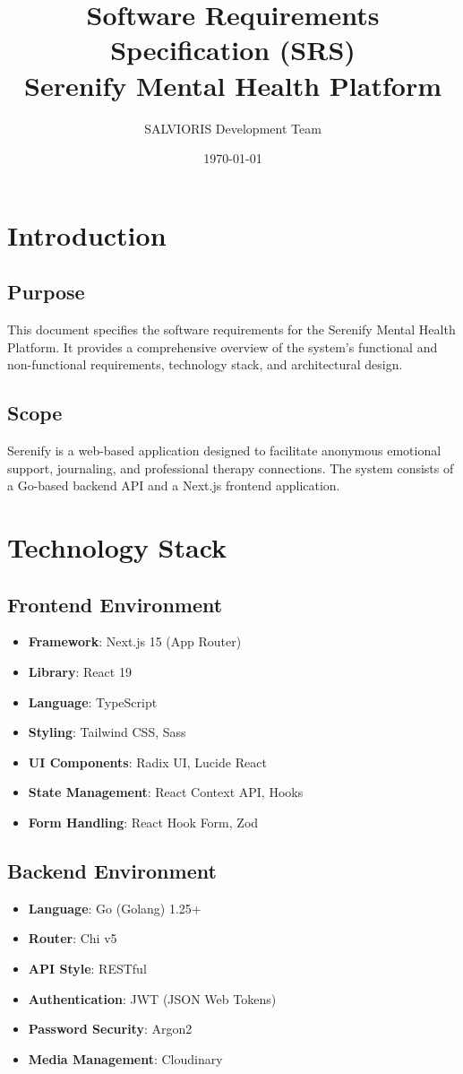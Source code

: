 \documentclass[11pt,a4paper]{article}
\title{\textbf{Software Requirements Specification (SRS) \\ Serenify Mental Health Platform}}
\author{SALVIORIS Development Team}
\date{\today}
\begin{document}
\maketitle
\tableofcontents
\newpage

\section{Introduction}
\subsection{Purpose}
This document specifies the software requirements for the Serenify Mental Health Platform. It provides a comprehensive overview of the system's functional and non-functional requirements, technology stack, and architectural design.

\subsection{Scope}
Serenify is a web-based application designed to facilitate anonymous emotional support, journaling, and professional therapy connections. The system consists of a Go-based backend API and a Next.js frontend application.

\section{Technology Stack}

\subsection{Frontend Environment}
\begin{itemize}
    \item \textbf{Framework}: Next.js 15 (App Router)
    \item \textbf{Library}: React 19
    \item \textbf{Language}: TypeScript
    \item \textbf{Styling}: Tailwind CSS, Sass
    \item \textbf{UI Components}: Radix UI, Lucide React
    \item \textbf{State Management}: React Context API, Hooks
    \item \textbf{Form Handling}: React Hook Form, Zod
\end{itemize}

\subsection{Backend Environment}
\begin{itemize}
    \item \textbf{Language}: Go (Golang) 1.25+
    \item \textbf{Router}: Chi v5
    \item \textbf{API Style}: RESTful
    \item \textbf{Authentication}: JWT (JSON Web Tokens)
    \item \textbf{Password Security}: Argon2
    \item \textbf{Media Management}: Cloudinary
\end{itemize}
\end{document}

